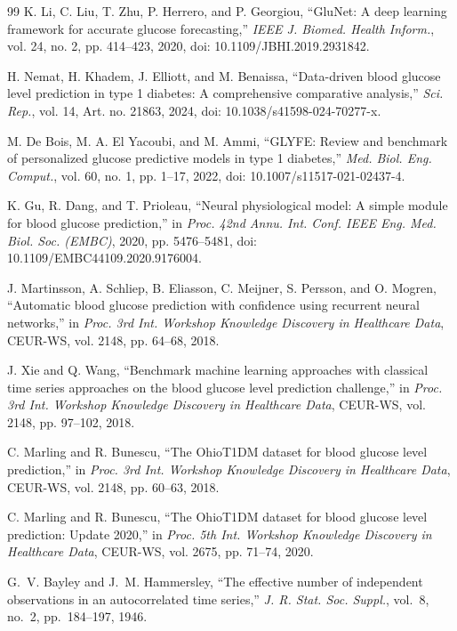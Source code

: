 \documentclass[journal]{IEEEtran}
\begin{document}
\begin{thebibliography}{99}
\label{ref81label} K. Li, C. Liu, T. Zhu, P. Herrero, and P. Georgiou, ``GluNet: A deep learning framework for accurate glucose forecasting,'' \emph{IEEE J. Biomed. Health Inform.}, vol. 24, no. 2, pp. 414--423, 2020, doi: 10.1109/JBHI.2019.2931842.

\label{ref82label} H. Nemat, H. Khadem, J. Elliott, and M. Benaissa, ``Data-driven blood glucose level prediction in type 1 diabetes: A comprehensive comparative analysis,'' \emph{Sci. Rep.}, vol. 14, Art. no. 21863, 2024, doi: 10.1038/s41598-024-70277-x.

\label{ref83label} M. De Bois, M. A. El Yacoubi, and M. Ammi, ``GLYFE: Review and benchmark of personalized glucose predictive models in type 1 diabetes,'' \emph{Med. Biol. Eng. Comput.}, vol. 60, no. 1, pp. 1--17, 2022, doi: 10.1007/s11517-021-02437-4.

\label{ref59label} K. Gu, R. Dang, and T. Prioleau, ``Neural physiological model: A simple module for blood glucose prediction,'' in \emph{Proc. 42nd Annu. Int. Conf. IEEE Eng. Med. Biol. Soc. (EMBC)}, 2020, pp. 5476--5481, doi: 10.1109/EMBC44109.2020.9176004.

\label{ref56label} J. Martinsson, A. Schliep, B. Eliasson, C. Meijner, S. Persson, and O. Mogren, ``Automatic blood glucose prediction with confidence using recurrent neural networks,'' in \emph{Proc. 3rd Int. Workshop Knowledge Discovery in Healthcare Data}, CEUR-WS, vol. 2148, pp. 64--68, 2018.

\label{ref57label} J. Xie and Q. Wang, ``Benchmark machine learning approaches with classical time series approaches on the blood glucose level prediction challenge,'' in \emph{Proc. 3rd Int. Workshop Knowledge Discovery in Healthcare Data}, CEUR-WS, vol. 2148, pp. 97--102, 2018.

\label{ref30label} C. Marling and R. Bunescu, ``The OhioT1DM dataset for blood glucose level prediction,'' in \emph{Proc. 3rd Int. Workshop Knowledge Discovery in Healthcare Data}, CEUR-WS, vol. 2148, pp. 60--63, 2018.

\label{ref31label} C. Marling and R. Bunescu, ``The OhioT1DM dataset for blood glucose level prediction: Update 2020,'' in \emph{Proc. 5th Int. Workshop Knowledge Discovery in Healthcare Data}, CEUR-WS, vol. 2675, pp. 71--74, 2020.

\label{refBHlabel} G.~V. Bayley and J.~M. Hammersley, ``The effective number of independent observations in an autocorrelated time series,'' \emph{J. R. Stat. Soc. Suppl.}, vol.~8, no.~2, pp.~184--197, 1946.


\end{thebibliography}
\end{document}
